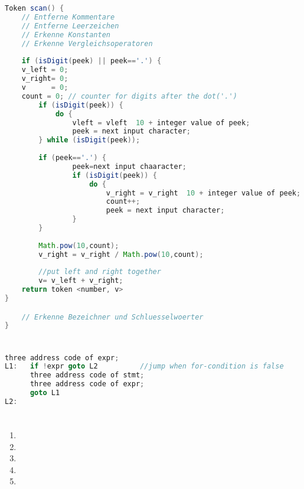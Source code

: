 \documentclass[a4paper,10pt]{scrartcl}
\begin{document}
\section{}
\begin{lstlisting}[language=Java,mathescape=True]
Token scan() {
    // Entferne Kommentare
    // Entferne Leerzeichen
    // Erkenne Konstanten
    // Erkenne Vergleichsoperatoren 
    
    if (isDigit(peek) || peek=='.') {
	v_left = 0;
	v_right= 0;
	v	   = 0;
	count = 0; // counter for digits after the dot('.')
		if (isDigit(peek)) {
			do {
				vleft = vleft  10 + integer value of peek;
				peek = next input character;
		} while (isDigit(peek));
		
		if (peek=='.') {
				peek=next input chaaracter;
				if (isDigit(peek)) {
					do {
						v_right = v_right  10 + integer value of peek;
						count++;
						peek = next input character;
				}
		}
		
		Math.pow(10,count);
		v_right = v_right / Math.pow(10,count);
		
		//put left and right together
		v= v_left + v_right;
	return token <number, v>
}

    // Erkenne Bezeichner und Schluesselwoerter
}
\end{lstlisting}
\section{}
\begin{lstlisting}[language=Java]
	  three address code of expr;
L1:   if !expr goto L2      	//jump when for-condition is false
      three address code of stmt;
	  three address code of expr;
      goto L1
L2:
\end{lstlisting}
\section{}
\begin{enumerate}
\item   
\item   
\item   
\item   
\item   
\end{enumerate}
\end{document}

